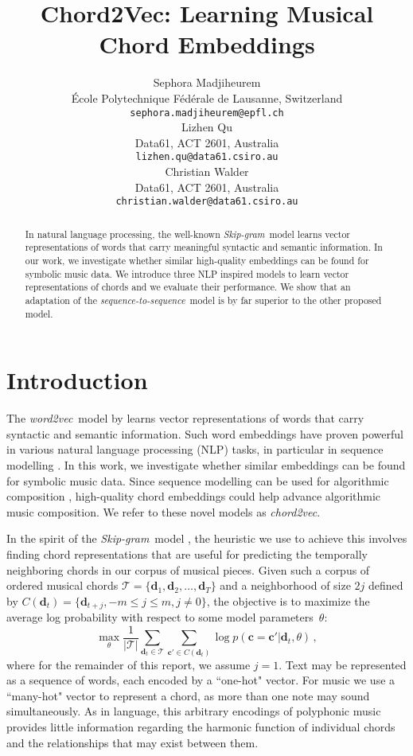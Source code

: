 \documentclass{article}
\title{Chord2Vec: Learning  Musical Chord Embeddings}
\author{
   Sephora Madjiheurem \\
   \'Ecole Polytechnique F\'ed\'erale de Lausanne, Switzerland \\
   \texttt{sephora.madjiheurem@epfl.ch} \\
   \AND
   Lizhen Qu \\
   Data61, ACT 2601, Australia \\
   \texttt{lizhen.qu@data61.csiro.au} \\
   \And
   Christian Walder \\
   Data61, ACT 2601, Australia \\
   \texttt{christian.walder@data61.csiro.au} \\
}
\newcommand{\T}{\mathcal{T}}
\newcommand{\boldc}{\boldsymbol c}
\newcommand{\boldd}{\boldsymbol d}
\newcommand{\skipgram}{\textit{Skip-gram}}
\newcommand{\wordtovec}{\textit{word2vec}}
\newcommand{\chordtovec}{\textit{chord2vec}}
\newcommand{\seqtoseq}{\textit{sequence-to-sequence}}
\begin{document}

\maketitle

\begin{abstract}
  In natural language processing, the well-known \skipgram\ model learns vector representations of words that carry meaningful syntactic and semantic information. In our work, we investigate whether similar high-quality embeddings can be found for symbolic music data. We introduce three NLP inspired models to learn vector representations of chords and we evaluate their performance. We show that an adaptation of the \seqtoseq\ model is by far superior to the other proposed model. 
  
\end{abstract}

\section{Introduction}

The \wordtovec\ model by \citet{mik2013} learns vector representations of words that carry syntactic and semantic information. Such word embeddings have proven powerful in various natural language processing (NLP) tasks, in particular in sequence modelling \citep{Cho, SutskeverVL14}. 
In this work, we investigate whether similar embeddings can be found for symbolic music data. Since sequence modelling can be used for algorithmic composition \cite{bl}, high-quality chord embeddings could help advance algorithmic music composition. 
We refer to these novel models as \chordtovec . %

In the spirit of the \skipgram\ model \citep{mik2013}, the heuristic we use to achieve this involves finding chord representations that are useful for predicting the temporally neighboring chords in our corpus of musical pieces. Given such a corpus of ordered musical chords  $\T = \{\boldd_1, \boldd_2, \ldots, \boldd_T\}$ and a neighborhood of size $2j$ defined by $ C(\boldd_t) = \{\boldd_{t+j}, -m \leq j \leq m , j \neq 0\}$, the objective is to maximize the average log probability with respect to some model parameters~$\theta$:
%
\begin{equation}
\max_{\theta} \frac{1}{|\T|}\sum_{\boldd_t \in \T} \sum_{\boldc' \in C(\boldd_t)} \log p(\boldc = \boldc'|\boldd_t, \theta)
 \,,
\label{eq:c2v_obj}
\end{equation} 
%
where for the remainder of this report, we assume $j=1$.
Text may be represented as a sequence of words, each encoded by a ``one-hot" vector. For music we use a ``many-hot" vector to represent a chord, as more than one note may sound simultaneously. As in language, this arbitrary encodings of polyphonic music provides little information regarding the harmonic function of individual chords and the relationships that may exist between them. 
\end{document}
